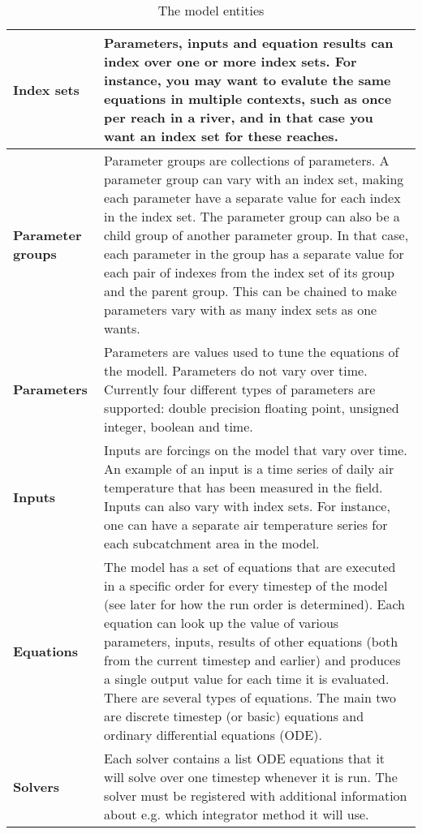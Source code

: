 \documentclass[11pt]{article}
\theoremstyle{definition}
\begin{document}
\begin{table}[H]
\centering
\label{tab:modelentity}
\begin{tabular}{|>{\bf}l|p{10cm} |}
\hline
Index sets & Parameters, inputs and equation results can index over one or more index sets. For instance, you may want to evalute the same equations in multiple contexts, such as once per reach in a river, and in that case you want an index set for these reaches. \\
\hline
Parameter groups & Parameter groups are collections of parameters. A parameter group can vary with an index set, making each parameter have a separate value for each index in the index set. The parameter group can also be a child group of another parameter group. In that case, each parameter in the group has a separate value for each pair of indexes from the index set of its group and the parent group. This can be chained to make parameters vary with as many index sets as one wants. \\
\hline
Parameters & Parameters are values used to tune the equations of the modell. Parameters do not vary over time. Currently four different types of parameters are supported: double precision floating point, unsigned integer, boolean and time. \\
\hline
Inputs & Inputs are forcings on the model that vary over time. An example of an input is a time series of daily air temperature that has been measured in the field. Inputs can also vary with index sets. For instance, one can have a separate air temperature series for each subcatchment area in the model.\\
\hline
Equations & The model has a set of equations that are executed in a specific order for every timestep of the model (see later for how the run order is determined). Each equation can look up the value of various parameters, inputs, results of other equations (both from the current timestep and earlier) and produces a single output value for each time it is evaluated. There are several types of equations. The main two are discrete timestep (or basic) equations and ordinary differential equations (ODE). \\
\hline
Solvers & Each solver contains a list ODE equations that it will solve over one timestep whenever it is run. The solver must be registered with additional information about e.g. which integrator method it will use. \\
\hline
\end{tabular}
\caption{The model entities}
\end{table}
\end{document}

